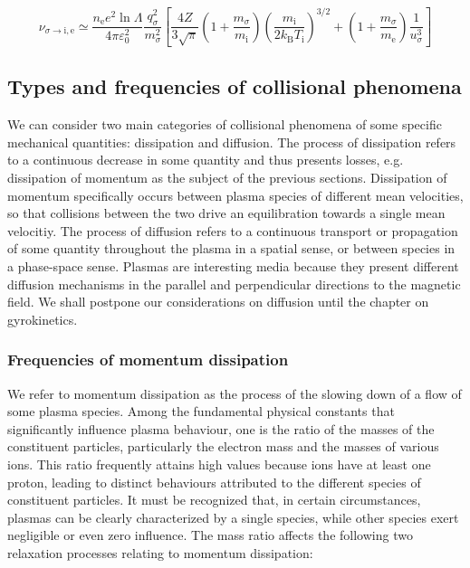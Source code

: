 \begin{equation}
    \nu_{\sigma\to\mathrm{i},\text{e}}\simeq\frac{n_\text{e}e^2\ln{\Lambda}}{4\pi\varepsilon_0^2}\frac{q_\sigma^2}{m_\sigma^2}\left[\frac{4Z}{3\sqrt{\pi}}\left(1+\frac{m_\sigma}{m_\mathrm{i}}\right)\left(\frac{m_\mathrm{i}}{2 k_\mathrm{B}T_\mathrm{i}}\right)^{3/2}+\left(1+\frac{m_\sigma}{m_\text{e}}\right)\frac{1}{u_\sigma^3}\right]
\end{equation}

\subsection{Types and frequencies of collisional phenomena}

We can consider two main categories of collisional phenomena of some specific mechanical quantities: dissipation and diffusion. The process of dissipation refers to a continuous decrease in some quantity and thus presents losses, e.g. dissipation of momentum as the subject of the previous sections. Dissipation of momentum specifically occurs between plasma species of different mean velocities, so that collisions between the two drive an equilibration towards a single mean velocitiy. The process of diffusion refers to a continuous transport or propagation of some quantity throughout the plasma in a spatial sense, or between species in a phase-space sense. Plasmas are interesting media because they present different diffusion mechanisms in the parallel and perpendicular directions to the magnetic field. We shall postpone our considerations on diffusion until the chapter on gyrokinetics.

\subsubsection{Frequencies of momentum dissipation}

We refer to momentum dissipation as the process of the slowing down of a flow of some plasma species. Among the fundamental physical constants that significantly influence plasma behaviour, one is the ratio of the masses of the constituent particles, particularly the electron mass and the masses of various ions. This ratio frequently attains high values because ions have at least one proton, leading to distinct behaviours attributed to the different species of constituent particles. It must be recognized that, in certain circumstances, plasmas can be clearly characterized by a single species, while other species exert negligible or even zero influence. The mass ratio affects the following two relaxation processes relating to momentum dissipation:

